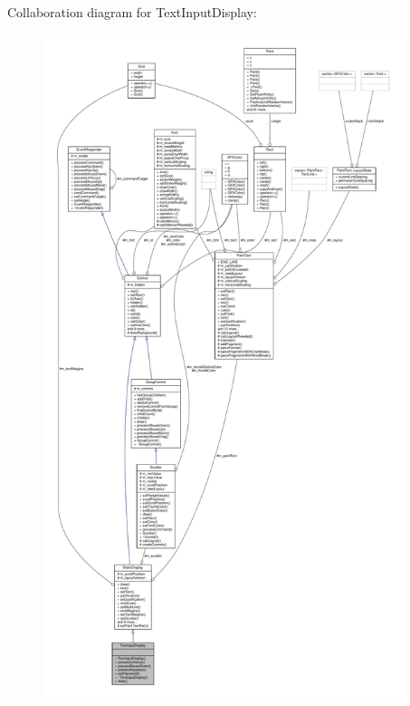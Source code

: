 Collaboration diagram for Text\+Input\+Display\+:
\nopagebreak
\begin{figure}[H]
\begin{center}
\leavevmode
\includegraphics[height=550pt]{d0/d6e/classTextInputDisplay__coll__graph}
\end{center}
\end{figure}
